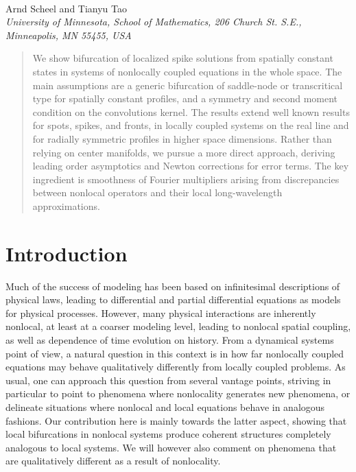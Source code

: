 \documentclass[10pt]{article}
\begin{document}
\begin{center}

{\fontsize{17}{17}\selectfont{Bifurcation to coherent structures in nonlocally coupled systems}}\\[0.2in]
Arnd Scheel and Tianyu Tao\\
\textit{\footnotesize 
University of Minnesota, School of Mathematics,   206 Church St. S.E., Minneapolis, MN 55455, USA}
\date{\small \today} 
\end{center}

\begin{abstract}
\noindent 
We show bifurcation of localized spike solutions from spatially constant states in systems of nonlocally coupled equations in the whole space. The main assumptions are a generic bifurcation of saddle-node or transcritical type for spatially constant profiles, and a symmetry and second moment condition on the convolutions kernel. The results extend well known results for spots, spikes, and fronts, in locally coupled systems on the real line and for radially symmetric profiles in higher space dimensions. Rather than relying on center manifolds, we pursue a more direct approach, deriving leading order asymptotics and Newton corrections for error terms. The key ingredient is smoothness of Fourier multipliers arising from discrepancies between nonlocal operators and their local long-wavelength approximations. 
\end{abstract}


\section{Introduction}\label{s:1}
Much of the success of modeling has been based on infinitesimal descriptions of physical laws, leading to differential and partial differential equations as models for physical processes. However, many physical interactions are inherently nonlocal, at least at a coarser modeling level, leading to nonlocal spatial coupling, as well as dependence of time evolution on history. From a dynamical systems point of view, a natural question in this context is in how far nonlocally coupled equations may behave qualitatively differently from locally coupled problems. As usual, one can approach this question from several vantage points, striving in particular to point to phenomena where nonlocality generates new phenomena, or delineate situations where nonlocal and local equations behave in analogous fashions. Our contribution here is mainly towards the latter aspect, showing that local bifurcations in nonlocal systems produce coherent structures completely analogous to local systems. We will however also comment on phenomena that are qualitatively different as a result of nonlocality. 
\end{document}
